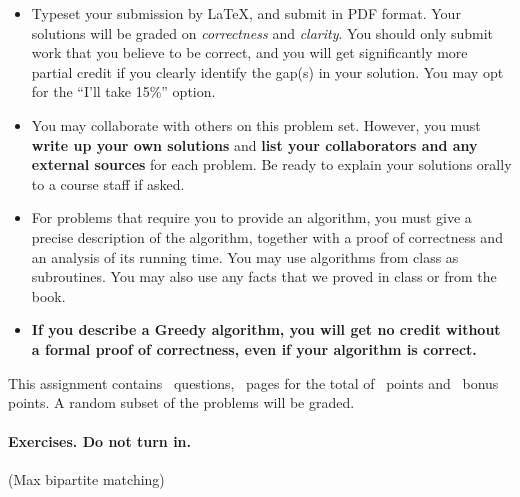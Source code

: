 \begin{itemize} 
\item Typeset your submission by \LaTeX, and submit in PDF
  format. Your solutions will be graded on \emph{correctness} and
  \emph{clarity}. You should only submit work that you believe to be
  correct, and you will get significantly more partial credit if you
  clearly identify the gap(s) in your solution. You may opt for the
  ``I’ll take 15\%'' option.
\item You may collaborate with others on this problem set.  However,
  you must \textbf{{write up your own solutions}} and \textbf{{list
      your collaborators and any external sources}} for each
  problem. Be ready to explain your solutions orally to a course staff
  if asked.
\item For problems that require you to provide an algorithm, you must
  give a precise description of the algorithm, together with a proof
  of correctness and an analysis of its running time. You may use
  algorithms from class as subroutines. You may also use any facts
  that we proved in class or from the book.
\item \textbf{If you describe a Greedy algorithm, you will get no
    credit without a formal proof of correctness, even if your
    algorithm is correct.}
\end{itemize}

\noindent This assignment contains \numquestions\ questions,
\numpages\ pages for the total of \numpoints \ points and
\numbonuspoints\ bonus points. A random subset of the problems will be
graded. \medskip

\paragraph{Exercises. Do not turn in.}
\begin{questions}
  \question (Max bipartite matching)

\end{questions}
\newpage 
